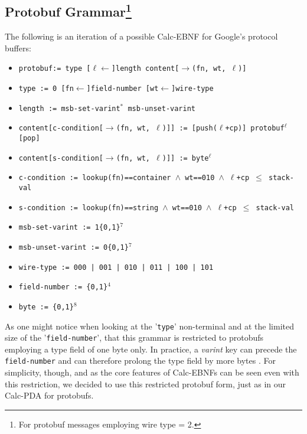 \subsection{Protobuf Grammar\footnote{For protobuf messages employing wire type = 2.}}
\label{5.3}
The following is an iteration of a possible Calc-EBNF for Google's protocol buffers:
\begin{itemize}
    \item[] \texttt{protobuf:= type [$\ell\leftarrow$]length content[$\rightarrow$(fn, wt, $\ell$)]}
    \item[] \texttt{type := 0 [fn$\leftarrow$]field-number [wt$\leftarrow$]wire-type}
    \item[] \texttt{length := msb-set-varint$^*$ msb-unset-varint}
    \item[] \texttt{content[c-condition[$\rightarrow$(fn, wt, $\ell$)]] := [push($\ell$+cp)] protobuf$^\ell$ [pop]}
    \item[] \texttt{content[s-condition[$\rightarrow$(fn, wt, $\ell$)]] := byte$^\ell$}
    \item[] \texttt{c-condition := lookup(fn)==container $\wedge$ wt==010 $\wedge$ $\ell$+cp $\leq$ stack-val}
    \item[] \texttt{s-condition := lookup(fn)==string $\wedge$ wt==010 $\wedge$ $\ell$+cp $\leq$ stack-val}
    \item[] \texttt{msb-set-varint := 1\{0,1\}$^7$}
    \item[] \texttt{msb-unset-varint := 0\{0,1\}$^7$}
    \item[] \texttt{wire-type := 000 | 001 | 010 | 011 | 100 | 101}
    \item[] \texttt{field-number := \{0,1\}$^4$}
    \item[] \texttt{byte := \{0,1\}$^8$}
\end{itemize}
As one might notice when looking at the '\texttt{type}' non-terminal and at the limited size of the '\texttt{field-number}', that this grammar is restricted to protobufs employing a type field of one byte only. In practice, a \textit{varint} key can precede the \texttt{field-number} and can therefore prolong the type field by more bytes \cite{google-protobuf-wire-type}. For simplicity, though, and as the core features of Calc-EBNFs can be seen even with this restriction, we decided to use this restricted protobuf form, just as in our Calc-PDA for protobufs.
